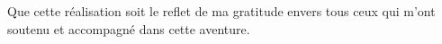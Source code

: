 \documentclass[a4paper,12pt]{report}
\begin{document}
\vspace{0.8cm}

Que cette réalisation soit le reflet de ma gratitude envers tous ceux qui m’ont soutenu et accompagné dans cette aventure.



\pagestyle{fancy}
\tableofcontents
\listoffigures
\listoftables
\newpage



\newpage
{}















\end{document}
